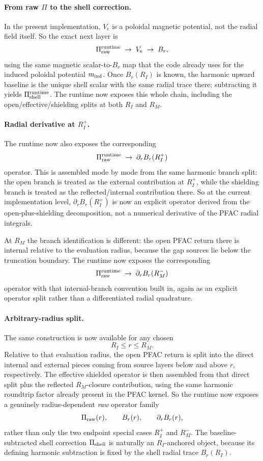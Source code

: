 \documentclass[11pt,a4paper]{article}
\begin{document}
\paragraph{From raw \(\Pi\) to the shell correction.}
In the present implementation, \(V_e\) is a poloidal magnetic potential, not
the radial field itself. So the exact next layer is
\[
\Pi_{\rm raw}^{\rm runtime}
\;\to\;
V_e
\;\to\;
B_r,
\]
using the same magnetic scalar-to-\(B_r\) map that the code already uses for
the induced poloidal potential \(m_{\rm ind}\). Once \(B_r(R_I)\) is known,
the harmonic upward baseline is the unique shell scalar with the same radial
trace there; subtracting it yields \(\Pi_{\rm shell}^{\rm runtime}\). The
runtime now exposes this whole chain, including the open/effective/shielding
splits at both \(R_I\) and \(R_M\).

\paragraph{Radial derivative at \(R_I^+\).}
The runtime now also exposes the corresponding
\[
\Pi_{\rm raw}^{\rm runtime}
\;\to\;
\partial_r B_r(R_I^+)
\]
operator. This is assembled mode by mode from the same harmonic branch split:
the open branch is treated as the external contribution at \(R_I^+\), while
the shielding branch is treated as the reflected/internal contribution there.
So at the current implementation level, \(\partial_r B_r(R_I^+)\) is now an
explicit operator derived from the open-plus-shielding decomposition, not a
numerical derivative of the PFAC radial integrals.

At \(R_M\) the branch identification is different: the open PFAC return there
is internal relative to the evaluation radius, because the gap sources lie
below the truncation boundary. The runtime now exposes the corresponding
\[
\Pi_{\rm raw}^{\rm runtime}
\;\to\;
\partial_r B_r(R_M^-)
\]
operator with that internal-branch convention built in, again as an explicit
operator split rather than a differentiated radial quadrature.

\paragraph{Arbitrary-radius split.}
The same construction is now available for any chosen
\[
R_I \le r \le R_M.
\]
Relative to that evaluation radius, the open PFAC return is split into the
direct internal and external pieces coming from source layers below and above
\(r\), respectively. The effective shielded operator is then assembled from
that direct split plus the reflected \(R_M\)-closure contribution, using the
same harmonic roundtrip factor already present in the PFAC kernel. So the
runtime now exposes a genuinely radius-dependent \emph{raw} operator family
\[
\Pi_{\rm raw}(r),\qquad B_r(r),\qquad \partial_r B_r(r),
\]
rather than only the two endpoint special cases \(R_I^+\) and \(R_M^-\).
The baseline-subtracted shell correction \(\Pi_{\rm shell}\) is naturally an
\(R_I\)-anchored object, because its defining harmonic subtraction is fixed by
the shell radial trace \(B_r(R_I)\).
\end{document}
